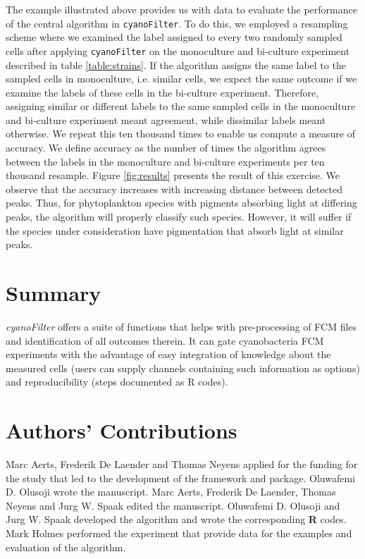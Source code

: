 \documentclass[a4paper,12pt]{extarticle}
\begin{document}
 The example illustrated above provides us with data to evaluate the performance of the central algorithm in \texttt{cyanoFilter}. To do this, we employed a resampling scheme where we examined the label assigned to every two randomly sampled cells after applying \texttt{cyanoFilter} on the monoculture and bi-culture experiment described in table \ref{table:strains}. If the algorithm assigns the same label to the sampled cells in monoculture, i.e. similar cells, we expect the same outcome if we examine the labels of these cells in the bi-culture experiment. Therefore, assigning similar or different labels to the same sampled cells in the monoculture and bi-culture experiment meant agreement, while dissimilar labels meant otherwise. We repeat this ten thousand times to enable us compute a measure of accuracy. We define accuracy as the number of times the algorithm agrees between the labels in the monoculture and bi-culture experiments per ten thousand resample. Figure \ref{fig:results} presents the result of this exercise. We observe that the accuracy increases with increasing distance between detected peaks. Thus, for phytoplankton species with pigments absorbing light at differing peaks, the algorithm will properly classify such species. However, it will suffer if the species under consideration have pigmentation that absorb light at similar peaks. 
 
 
\section*{Summary}
 \emph{cyanoFilter} offers a suite of functions that helps with pre-processing of FCM files and identification of all outcomes therein. It can gate cyanobacteria FCM experiments with the advantage of easy integration of knowledge about the measured cells (users can supply channels containing such information as options) and reproducibility (steps documented as R codes).
 
\section*{Authors' Contributions}
Marc Aerts, Frederik De Laender and Thomas Neyens applied for the funding for the study that led to the development of the framework and package. Oluwafemi D. Olusoji wrote the manuscript. Marc Aerts, Frederik De Laender, Thomas Neyens and Jurg W. Spaak edited the manuscript.  Oluwafemi D. Olusoji and Jurg W. Spaak developed the algorithm and wrote the corresponding \textbf{R} codes. Mark Holmes performed the experiment that provide data for the examples and evaluation of the algorithm. 
 
\end{document}
